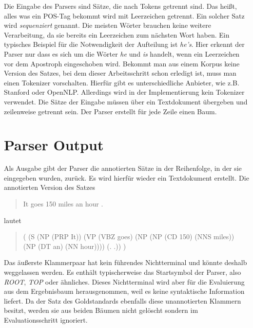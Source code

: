 Die Eingabe des Parsers sind Sätze, die nach Tokens getrennt sind. Das heißt, alles was ein POS-Tag bekommt wird mit Leerzeichen getrennt. Ein solcher Satz wird \textit{sequenziert} genannt. Die meisten Wörter brauchen keine weitere Verarbeitung, da sie bereits ein Leerzeichen zum nächsten Wort haben. Ein typisches Beispiel für die Notwendigkeit der Aufteilung ist \textit{he's}. Hier erkennt der Parser nur dass es sich um die Wörter \textit{he} und \textit{is} handelt, wenn ein Leerzeichen vor dem Apostroph eingeschoben wird. Bekommt man aus einem Korpus keine Version des Satzes, bei dem dieser Arbeitsschritt schon erledigt ist, muss man einen Tokenizer vorschalten. Hierfür gibt es unterschiedliche Anbieter, wie z.B. Stanford oder OpenNLP. %
Allerdings wird in der Implementierung kein Tokenizer verwendet. Die Sätze der Eingabe müssen über ein Textdokument übergeben und zeilenweise getrennt sein. Der Parser erstellt für jede Zeile einen Baum.

\section{Parser Output}
Als Ausgabe gibt der Parser die annotierten Sätze in der Reihenfolge, in der sie eingegeben wurden, zurück. Es wird hierfür wieder ein Textdokument erstellt. %
Die annotierten Version des Satzes
\begin{quote}
It goes 150 miles an hour .
\end{quote}
lautet
\begin{quote}
( (S (NP (PRP It)) (VP (VBZ goes) (NP (NP (CD 150) (NNS miles)) \\(NP (DT an) (NN hour)))) (. .)) )
\end{quote}
Das äußerste Klammerpaar hat kein führendes Nichtterminal und könnte deshalb weggelassen werden. Es enthält typischerweise das Startsymbol der Parser, also \textit{ROOT}, \textit{TOP} oder ähnliches. Dieses Nichtterminal wird aber für die Evaluierung aus dem Ergebnisbaum herausgenommen, weil es keine syntaktische Information liefert. Da der Satz des Goldstandards ebenfalls diese unannotierten Klammern besitzt, werden sie aus beiden Bäumen nicht gelöscht sondern im Evaluationsschritt ignoriert.
